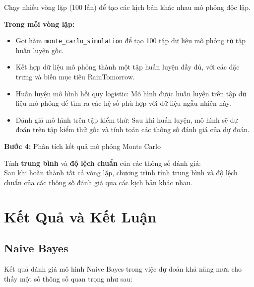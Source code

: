 \documentclass[conference]{IEEEtran}
\begin{document}
\noindent Chạy nhiều vòng lặp (100 lần) để tạo các kịch bản khác nhau mô phỏng độc lập.

\textbf{Trong mỗi vòng lặp:}
\begin{itemize}
    \item Gọi hàm \texttt{monte\_carlo\_simulation} để tạo 100 tập dữ liệu mô phỏng từ tập huấn luyện gốc.
    \item Kết hợp dữ liệu mô phỏng thành một tập huấn luyện đầy đủ, với các đặc trưng và biến mục tiêu RainTomorrow.
    \item Huấn luyện mô hình hồi quy logistic: Mô hình được huấn luyện trên tập dữ liệu mô phỏng để tìm ra các hệ số phù hợp với dữ liệu ngẫu nhiên này.
    \item Đánh giá mô hình trên tập kiểm thử: Sau khi huấn luyện, mô hình sẽ dự đoán trên tập kiểm thử gốc và tính toán các thông số đánh giá của dự đoán.
\end{itemize}
\textbf{Bước 4:} Phân tích kết quả mô phỏng Monte Carlo

\noindent Tính \textbf{trung bình} và \textbf{độ lệch chuẩn} của các thông số đánh giá:\\ 
\indent Sau khi hoàn thành tất cả vòng lặp, chương trình tính trung bình và độ lệch chuẩn của các thông số đánh giá qua các kịch bản khác nhau.

\section{Kết Quả và Kết Luận}
\subsection {Naive Bayes}
Kết quả đánh giá mô hình Naive Bayes trong việc dự đoán khả năng mưa cho thấy một số thông số quan trọng như sau:
\end{document}
